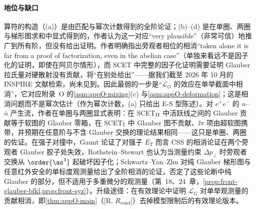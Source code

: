 \paragraph{地位与缺口}
算符的构造（(a)）是由匹配与幂次计数得到的全阶论证；(b)--(d) 是在单圈、两圈与梯形图求和中显式得到的，作者认为这一对应“very plausible”（非常可信）地推广到所有阶，但没有给出证明\cite[第~10.2~节]{RothsteinStewart2016}。作者明确指出旁观者相位的相消“taken alone it is far from a proof of factorization, even in the abelian case”（单独来看远不是因子化的证明，即使在阿贝尔情形）\cite[第~11.1~节]{RothsteinStewart2016}，而 SCET 中完整的因子化证明需要证明 Glauber 拉氏量对硬散射没有贡献，将“在别处给出”\cite[第~11~节]{RothsteinStewart2016}——据我们截至 2026 年 10 月的 INSPIRE 文献检索，尚未见到。因此最弱的一步是“$\mathcal L_G$ 的效应在单举截面中相消”，它对应附录~O 的\cref{asm:appO-mixing}(c) 与\cref{asm:appO-deformation}；这是相消问题而不是幂次估计（作为幂次计数，(a) 只给出 E-S 型陈述）。对 $e^+e^-$ 的 $n$–$\bar n$ 产生流，作者在单圈与两圈显式表明：在 SCET$_{\rm II}$ 中活跃线之间的 Glauber 贡献等于软图的 Glauber 零箱，在 SCET$_{\rm I}$ 中 Glauber 图不贡献、$\ii\pi$ 项由超软图携带，并预期在任意阶与不含 Glauber 交换的理论结果相同\cite[第~10.1、10.3~节]{RothsteinStewart2016}——这只是单圈、两圈的佐证。在强子对撞中，Gaunt 论证了对强子 $E_T$ 而言 CSS 的相消论证在两个旁观者 Glauber 胶子处失效\cite{Gaunt2014}，Rothstein--Stewart 也认为当测量约束 $\Delta p_\perp$ 时旁观者交换从 $\order{\as^4}$ 起破坏因子化\cite[第~11.1~节]{RothsteinStewart2016}；Schwartz--Yan--Zhu 对纯 Glauber 梯形图与任意红外安全的单标度观测量给出了全阶相消的论证，否定了这些论断中纯 Glauber 的部分，但不适用于多重微分的观测量\cite{Schwartz:2018obd}（第~18、24~章，\cref{prop:front-glauber-bfkl,prop:front-syz}）。升级途径：在有效理论中证明 $\mathcal L_G$ 对单举观测量的贡献相消，即\cref{thm:appO-main}（[R, $R_{\mathrm{cond}}$]）去掉模型限制后的有效理论版本。

